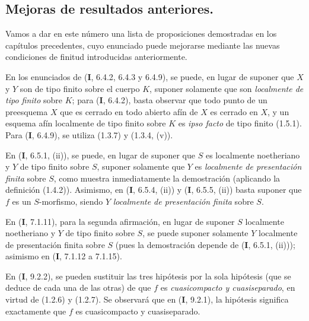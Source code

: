\subsection{Mejoras de resultados anteriores.}
\label{subsection:IV.1.7-fr}

Vamos a dar en este número una lista de proposiciones demostradas en
los capítulos precedentes, cuyo enunciado puede mejorarse mediante las
nuevas condiciones de finitud introducidas anteriormente.

\begin{env}[1.7.1]
\label{IV.1.7.1-fr}
En los enunciados de (\textbf{I}, 6.4.2, 6.4.3 y 6.4.9), se puede, en lugar de suponer
que $X$ y $Y$ son de tipo finito sobre el cuerpo $K$, suponer solamente que
son \emph{localmente de tipo finito} sobre $K$; para (\textbf{I}, 6.4.2), basta
observar que todo punto de un preesquema $X$ que es cerrado en todo abierto
afín de $X$ es cerrado en $X$, y un esquema afín localmente de tipo finito
sobre $K$ es \emph{ipso facto} de tipo finito (1.5.1). Para (\textbf{I}, 6.4.9), se utiliza
(1.3.7) y (1.3.4, (v)).
\end{env}

\begin{env}[1.7.2]
\label{IV.1.7.2-fr}
En (\textbf{I}, 6.5.1, (ii)), se puede, en lugar de suponer que $S$ es localmente
noetheriano y $Y$ de tipo finito sobre $S$, suponer solamente que $Y$ es
\emph{localmente de presentación finita} sobre $S$, como muestra inmediatamente la
demostración (aplicando la definición (1.4.2)). Asimismo, en (\textbf{I}, 6.5.4,
(ii)) y (\textbf{I}, 6.5.5, (ii)) basta suponer que $f$ es un $S$-morfismo,
siendo $Y$ \emph{localmente de presentación finita} sobre $S$.
\end{env}

\begin{env}[1.7.3]
\label{IV.1.7.3-fr}
En (\textbf{I}, 7.1.11), para la segunda afirmación, en lugar de suponer $S$
localmente noetheriano y $Y$ de tipo finito sobre $S$, se puede suponer solamente
$Y$ localmente de presentación finita sobre $S$ (pues la demostración depende de
(\textbf{I}, 6.5.1, (ii))); asimismo en (\textbf{I}, 7.1.12 a 7.1.15).
\end{env}

\begin{env}[1.7.4]
En (\textbf{I}, 9.2.2), se pueden sustituir las tres hipótesis por la sola hipótesis
(que se deduce de cada una de las otras) de que $f$ es \emph{cuasicompacto y
cuasiseparado}, en virtud de (1.2.6) y (1.2.7). Se observará que en (\textbf{I}, 9.2.1),
la hipótesis significa exactamente que $f$ es cuasicompacto y cuasiseparado.
\end{env}

